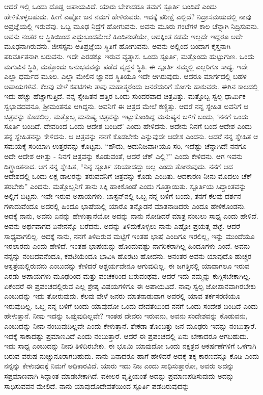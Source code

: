 ಆದರೆ ಇಲ್ಲಿ ಒಂದು ದೊಡ್ಡ ಅಪಾಯವಿದೆ. ಯಾರು ಬೇಕಾದರೂ ತಮಗೆ ಸ್ಫೂರ್ತಿ ಬಂದಿದೆ ಎಂದು ಹೇಳಿಕೊಳ್ಳಬಹುದು. ಹೀಗೆ ಎಷ್ಟೋ ಜನ ನಮಗೆ ಹೇಳಿರುವರು. ಇದಕ್ಕೆ ಪರೀಕ್ಷೆ ಎಲ್ಲಿದೆ? ನಿದ್ರಾಸಮಯದಲ್ಲಿ ನಾವು ಅಪ್ರಜ್ಞೆಯಲ್ಲಿ ಇರುವೆವು. ಒಬ್ಬ ಮೂಢ ನಿದ್ರೆಗೆ ಹೋಗುವನು. ಅವನು ಮೂರು ಗಂಟೆಗಳ ಕಾಲ ಚೆನ್ನಾಗಿ ನಿದ್ರಿಸುವನು. ಅವನು ನಂತರ ಆ ಸ್ಥಿತಿಯಿಂದ ಎದ್ದುಬಂದಮೇಲೆ ಹಿಂದಿನಂತೆಯೇ, ಅದಕ್ಕಿಂತ ಕಡಮೆ ಇಲ್ಲದೇ ಇದ್ದರೂ ಅದೇ ಮೂಢನಾಗಿರುವನು. ಜೀಸಸ್ಸನು ಅತಿಪ್ರಜ್ಞೆಯ ಸ್ಥಿತಿಗೆ ಹೋಗುವನು. ಅವನು ಅಲ್ಲಿಂದ ಬಂದಾಗ ಕೈಸ್ತನಾಗಿ ಪರಿವರ್ತಿತನಾಗಿ ಬರುವನು. ಇದೇ ಎರಡಕ್ಕೂ ಇರುವ ವ್ಯತ್ಯಾಸ. ಒಂದು ಸ್ಪೂರ್ತಿ, ಮತ್ತೊಂದು ಹುಟ್ಟುಗುಣ. ಒಂದು ಮಗುವಿನ ಸ್ಥಿತಿ, ಮತ್ತೊಂದು ಅನುಭವವನ್ನು ಪಡೆದ ವೃದ್ಧನ ಸ್ಥಿತಿ. ಈ ಸ್ಪೂರ್ತಿ ನಮ್ಮಲ್ಲಿ ಎಲ್ಲರಿಗೂ ಸಾಧ್ಯ. ಇದೇ ಎಲ್ಲಾ ಧರ್ಮದ ಮೂಲ. ಎಲ್ಲಾ ಮೇಲಿನ ಜ್ಞಾನದ ಸ್ಥಿತಿಯೂ ಇದೇ ಆಗಿರುವುದು. ಆದರೂ ಮಾರ್ಗದಲ್ಲಿ ಬಹಳ ಅಪಾಯಗಳಿವೆ. ಕೆಲವು ವೇಳೆ ಕಪಟಿಗಳು ತಾವು ಮಹಾತ್ಮರೆಂದು ಜನರೆದುರಿಗೆ ಸೋಗು ಹಾಕುವರು. ಈಗಿನ ಕಾಲದಲ್ಲಿ ಇದು ಹೆಚ್ಚು ಹೆಚ್ಚಾಗುತ್ತಿದೆ. ನನ್ನ ಸ್ನೇಹಿತನ ಹತ್ತಿರ ಒಂದು ಸುಂದರವಾದ ಚಿತ್ರವಿತ್ತು. ಮತ್ತೊಬ್ಬ ಸ್ವಲ್ಪ ಧಾರ್ಮಿಕ ಸ್ವಭಾವದವನೂ, ಶ‍್ರೀಮಂತನೂ ಆಗಿದ್ದನು. ಅವನಿಗೆ ಈ ಚಿತ್ರದ ಮೇಲೆ ಕಣ್ಣಿತ್ತು. ಆದರೆ ನನ್ನ ಸ್ನೇಹಿತ ಅವನಿಗೆ ಆ ಚಿತ್ರವನ್ನು ಕೊಡಲಿಲ್ಲ. ಮತ್ತೊಬ್ಬ ಮನುಷ್ಯ ಚಿತ್ರವನ್ನು ಇಟ್ಟುಕೊಂಡಿದ್ದ ಮನುಷ್ಯನ ಬಳಿಗೆ ಬಂದು, `ನನಗೆ ಒಂದು ಸೂರ್ತಿ ಬಂದಿದೆ. ದೇವರಿಂದ ಒಂದು ಆದೇಶ ಬಂದಿದೆ' ಎಂದು ಹೇಳಿದನು. ಅದೇನು ನಿನಗೆ ಬಂದ ಆದೇಶ ಎಂದು ತನ್ನ ಸ್ನೇಹಿತನನ್ನು ಕೇಳಿದನು. ಆ ಚಿತ್ರವನ್ನು ನನಗೆ ಕೊಡಬೇಕು ಎನ್ನುವುದೇ ಆದೇಶ ಎಂದನು. ಆದರೆ ನನ್ನ ಸ್ನೇಹಿತ ಆ ಸಮಯಕ್ಕೆ ಸರಿಯಾಗಿ ಉತ್ತರವನ್ನು ಕೊಟ್ಟನು. “ಹೌದು, ಅದು\break ನಿಜವಾಗಿಯೂ ಸರಿ, ಇದೆಷ್ಟು ಚೆನ್ನಾಗಿದೆ! ನನಗೂ ಅದೇ ಆದೇಶ ಆಗಿತ್ತು - ನಿನಗೆ ಚಿತ್ರವನ್ನು ಕೊಡುವಂತೆ, ಆದರೆ ಚೆಕ್ ಎಲ್ಲಿ?” ಎಂದು ಕೇಳಿದನು. ಆಗ ಇವನು ದಿಗ್ಭ್ರಾಂತನಾದ. ಆಗ ನನ್ನ ಸ್ನೇಹಿತ, “ನಿನ್ನ ಸ್ಪೂರ್ತಿ ಸರಿಯಾದದ್ದು ಅಲ್ಲ ಎಂದು ತೋರುವುದು. ನನಗೆ ಆದ ಆದೇಶದಲ್ಲಿ ಒಂದು ಲಕ್ಷ ಡಾಲರನ್ನು ತರುವವನಿಗೆ ಚಿತ್ರವನ್ನು ಕೊಡು ಎಂದಿತು. ಆದಕಾರಣ ನೀನು ಮೊದಲು ಚೆಕ್ ತರಬೇಕು'' ಎಂದನು. ಮತ್ತೊಬ್ಬನಿಗೆ ತಾನು ಸಿಕ್ಕಿ ಹಾಕಿಕೊಂಡೆ ಎಂದು ಗೊತ್ತಾಯಿತು. ಸ್ಪೂರ್ತಿಯ ಸಿದ್ದಾಂತವನ್ನು ಅಲ್ಲಿಗೆ ಬಿಟ್ಟನು. ಇವೇ ಇರುವ ಅಪಾಯಗಳು. ಬಾಸ್ಟನ್‌ನಲ್ಲಿ ಒಬ್ಬ ನನ್ನ ಬಳಿಗೆ ಬಂದು, ತನಗೆ ಕೆಲವು ದರ್ಶನ ಗಳಾದುವೆಂದೂ ಅದರಲ್ಲಿ ಹಿಂದೂ ಭಾಷೆಯಲ್ಲಿ ಯಾರೊ ತನ್ನೊಡನೆ ಮಾತನಾಡಿದರು ಎಂದೂ ಹೇಳಿಕೊಂಡನು. ಅದಕ್ಕೆ ನಾನು, ಅವನು ಏನನ್ನು ಹೇಳುತ್ತಾನೆಯೋ ಅದನ್ನು ನಾನು ನೋಡಿದರೆ ಮಾತ್ರ ನಂಬಲು ಸಾಧ್ಯ ಎಂದು ಹೇಳಿದೆ. ಅವನು ಅರ್ಥವಾಗದ ಏನೇನನ್ನೊ ಬರೆದನು. ಅದನ್ನು ತಿಳಿದುಕೊಳ್ಳಲು ನಾನು ಎಷ್ಟೋ ಪ್ರಯತ್ನ ಪಟ್ಟೆ. ಆದರೆ ಸಾಧ್ಯವಾಗಲಿಲ್ಲ. ಅದಕ್ಕೆ ನಾನು, ನನಗೆ ತಿಳಿದಿರುವ ಮಟ್ಟಿಗೆ ಇಂತಹ ಭಾಷೆ ಎಂದಿಗೂ ಇರಲಿಲ್ಲ, ಇನ್ನು ಮುಂದೆಯೂ ಇರಲಾರದು ಎಂದು ಹೇಳಿದೆ. ಇಂತಹ ಭಾಷೆಯನ್ನು ಹೊಂದುವಷ್ಟು ನಾಗರಿಕರಾಗಿಲ್ಲ ಹಿಂದೂಗಳು ಎಂದೆ. ಅವನು ನನ್ನನ್ನು ನಂಬದವನೆಂದೂ, ಕಪಟಿಯೆಂದೂ ಭಾವಿಸಿ ಹೊರಟು ಹೋದನು. ಅನಂತರ ಅವನು ಯಾವುದೊ ಹುಚ್ಚರ ಆಸ್ಪತ್ರೆಯಲ್ಲಿರುವನು ಎಂಬುದನ್ನು ಕೇಳಿದರೆ ಆಶ್ಚರ್ಯವೇನೂ ಆಗುವುದಿಲ್ಲ. ಈ ಜಗತ್ತಿನಲ್ಲಿ ಯಾವಾಗಲೂ ಇರುವ ಎರಡು ಅಪಾಯಗಳು ಮೂಢರಿಂದ ಮತ್ತು ವಂಚಕರಿಂದ ಬರುವಂಥವು. ಆದರೆ ಇದು ನಮ್ಮನ್ನು ಕುಗ್ಗಿಸಬೇಕಾಗಿಲ್ಲ. ಏಕೆಂದರೆ ಈ ಪ್ರಪಂಚದಲ್ಲಿರುವ ಎಲ್ಲ ಶ್ರೇಷ್ಠ ವಿಷಯಗಳಿಗೂ ಈ ಅಪಾಯವಿದೆ. ನಾವು ಸ್ವಲ್ಪ ಜೋಪಾನವಾಗಿರಬೇಕು ಎಂಬುದನ್ನು ಇದು ತೋರುವುದು. ಕೆಲವು ವೇಳೆ ಜನರು ಮಾತನಾಡುವಾಗ ಅವರಲ್ಲಿ ಯಾವ ತರ್ಕಸರಣಿಯೂ ಇರುವುದಿಲ್ಲ. ಒಬ್ಬ ನನ್ನ ಬಳಿಗೆ ಬಂದು ಯಾವುದೋ ಒಂದು ದೇವತೆಯಿಂದ ನನಗೆ ಒಂದು ಸಂದೇಶ ಬಂದಿದೆ ಎಂದು ಹೇಳುತ್ತಾನೆ. ನೀವು ಇದನ್ನು ಒಪ್ಪುವುದಿಲ್ಲವೇ? ಇಂತಹ ದೇವರು ಇರುವನು, ಅವನು ಸಂದೇಶವನ್ನು ಕೊಡುವನು, ಎಂಬುದನ್ನು ನೀವು ನಂಬುವುದಿಲ್ಲವೇ ಎಂದು ಕೇಳುತ್ತಾನೆ. ಶೇಕಡಾ ತೊಂಬತ್ತು ಜನ ಮೂಢರು ಇದನ್ನು ನಂಬುತ್ತಾರೆ. ಇದಕ್ಕೆ ಸಾಕಾದಷ್ಟು ಪ್ರಮಾಣವಿದೆ ಎಂದು ನಂಬುತ್ತಾರೆ. ಆದರೆ ಈ ಪ್ರಪಂಚದಲ್ಲಿ ಏನು ಬೇಕಾದರೂ ಆಗಬಹುದು. ಇದು ಸಾಧ್ಯ ಎಂಬುದನ್ನು ನೀವು ತಿಳಿದಿರಬೇಕು. ಈ ಭೂಮಿ ಯಾವುದೋ ಒಂದು ನಕ್ಷತ್ರದ ಆಕರ್ಷಣೆಗಳಿಗೆ ಒಳಗಾಗಿ ಬರುವ ವರುಷ ನುಚ್ಚುನೂರಾಗಬಹುದು. ನಾನು ಏನಾದರೂ ಹಾಗೆ ಹೇಳಿದರೆ ಅದಕ್ಕೆ ತಕ್ಕ ಕಾರಣವನ್ನೂ ಕೊಡಿ ಎಂದು ನನ್ನನ್ನು ಕೇಳುವುದಕ್ಕೆ ನಿಮಗೆ ಅಧಿಕಾರವಿದೆ. ಯಾರು ಇದು ನಿಜ ಎಂದು ಸಾಧಿಸುತ್ತಾರೋ, ಅವರು ಅದನ್ನು ಸಪ್ರಮಾಣವಾಗಿ ಸಿದ್ದಾಂತ ಮಾಡಬೇಕಾಗಿದೆ. ವಕೀಲರ ವೃತ್ತಿಯಂತೆ ಅದನ್ನು ಪ್ರಮಾಣಪಡಿಸುವುದು ಅದನ್ನು ಸಾಧಿಸುವವನ ಮೇಲಿದೆ. ನಾನು ಯಾವುದೊ\break ದೇವತೆಯಿಂದ ಸ್ಪೂರ್ತಿ ಪಡೆದಿರುವುದನ್ನು 